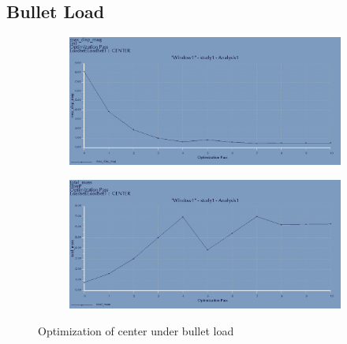 \documentclass[12pt,letterpaper]{report}
\begin{document}
		\subsection{Bullet Load}
		\graphicspath{ {./ScreenShots/Bullet/} }
		\begin{figure}[H]
			\centering
			\begin{subfigure}{.45\textwidth}
				\includegraphics[width=\textwidth]{CenterBulletOptimDispGraph}
				\label{fig:CenterBulletOptimDispGraph}
			\end{subfigure}
			\begin{subfigure}{.45\textwidth}
				\includegraphics[width=\textwidth]{CenterBulletOptimMassGraph}
				\label{fig:CenterBulletOptimMassGraph}
			\end{subfigure}
			\caption{Optimization of center under bullet load}
		\end{figure}
		
\end{document}
